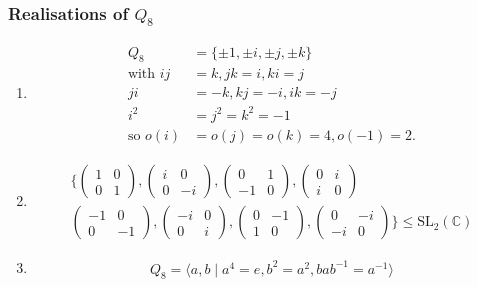 \subsubsection{Realisations of \texorpdfstring{$Q_8$}{Q₈}}

\begin{enumerate}
  \item \begin{align*}
    Q_8 &= \{ \pm 1, \pm i, \pm j, \pm k \} \\
    \text{with } ij &= k, jk = i, ki = j \\
    ji &= -k, kj = -i, ik = -j \\
    i^2 &= j^2 = k^2 = -1 \\
    \text{so } o(i) &= o(j) = o(k) = 4, o(-1) = 2.
  \end{align*} 
  \item \begin{align*}
    \bigg\{ \begin{pmatrix}
      1&0\\0&1
    \end{pmatrix},
    \begin{pmatrix}
      i & 0\\0&-i
    \end{pmatrix},
    \begin{pmatrix}
      0&1\\-1&0
    \end{pmatrix},
    \begin{pmatrix}
      0&i\\i&0
    \end{pmatrix}
    \\
    \begin{pmatrix}
      -1&0\\0&-1
    \end{pmatrix},
    \begin{pmatrix}
      -i & 0\\0&i
    \end{pmatrix},
    \begin{pmatrix}
      0&-1\\1&0
    \end{pmatrix},
    \begin{pmatrix}
      0&-i\\-i&0
    \end{pmatrix} \bigg\} \leq \mathrm{SL}_2(\mathbb{C})
  \end{align*}
  \item \begin{align*}
    Q_8 = \langle a, b \mid a^4 = e, b^2 = a^2, b a b^{-1} = a^{-1} \rangle
  \end{align*} 
\end{enumerate} 

